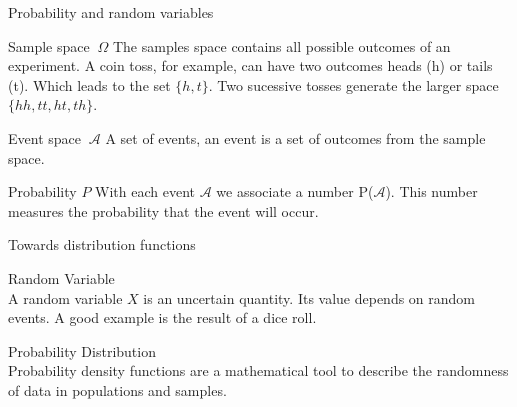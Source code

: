 \documentclass{beamer}
\begin{document}
    \begin{frame}{Probability and random variables \cite{deisenroth2020mathematics}}
      \begin{block}{Sample space $~\Omega $}
        The samples space contains all possible outcomes of an experiment.
        A coin toss, for example, can have two outcomes heads (h) or tails (t).
        Which leads to the set $\{h, t \}$. Two sucessive tosses generate the
        larger space $\{ hh, tt, ht, th \}$. 
      \end{block}
      \begin{block}{Event space $~\mathcal{A}$}
        A set of events, an event is a set of outcomes from the sample space.
      \end{block}
      \begin{block}{Probability $P$}
        With each event $\mathcal{A}$ we associate a number P($\mathcal{A}$).
        This number measures the probability that the event will occur.
      \end{block}
    \end{frame}
    

    \begin{frame}{Towards distribution functions \cite{haslwanter2016introduction}}
      \begin{block}{Random Variable}
        $\;$ \\
        A random variable $X$ is an uncertain quantity. Its value depends on random events.
        A good example is the result of a dice roll.
      \end{block}

      \begin{block}{Probability Distribution}
        $\;$ \\
        Probability density functions are a mathematical tool to describe the randomness of data
        in populations and samples.
      \end{block}

    \end{frame}
\end{document}
